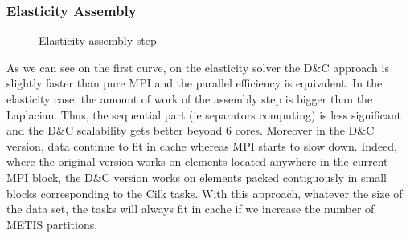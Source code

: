 \documentclass{IOS-Book-Article}
\begin{document}
\subsubsection{Elasticity Assembly}
\begin{figure}[htp]
 \centering
 \hspace{1em}%
 \caption{Elasticity assembly step}
\end{figure}
As we can see on the first curve, on the elasticity solver the D\&C approach is slightly faster than pure MPI and the parallel efficiency is equivalent.
In the elasticity case, the amount of work of the assembly step is bigger than the Laplacian.
Thus, the sequential part (ie separators computing) is less significant and the D\&C scalability gets better beyond 6 cores.
Moreover in the D\&C version, data continue to fit in cache whereas MPI starts to slow down. Indeed, where the original version works on elements located
anywhere in the current MPI block, the D\&C version works on elements packed contiguously in small blocks corresponding to the Cilk tasks.
With this approach, whatever the size of the data set, the tasks will always fit in cache if we increase the number of METIS partitions.
\end{document}
